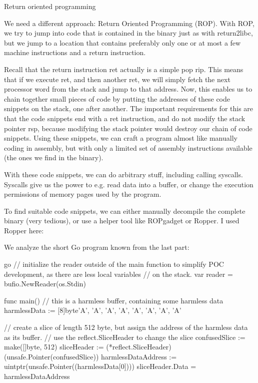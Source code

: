         Return oriented programming

        We need a different approach: Return Oriented Programming (ROP). With ROP, we try to jump into code that is contained
        in the binary just as with return2libc, but we jump to a location that contains preferably only one or at most a few
        machine instructions and a return instruction.

        Recall that the return instruction ret actually is a simple pop rip. This means that if we execute ret, and then
        another ret, we will simply fetch the next processor word from the stack and jump to that address. Now, this enables
        us to chain together small pieces of code by putting the addresses of these code snippets on the stack, one after
        another. The important requirements for this are that the code snippets end with a ret instruction, and do not modify
        the stack pointer rsp, because modifying the stack pointer would destroy our chain of code snippets. Using these
        snippets, we can craft a program almost like manually coding in assembly, but with only a limited set of assembly
        instructions available (the ones we find in the binary).

        With these code snippets, we can do arbitrary stuff, including calling syscalls. Syscalls give us the power to e.g.
        read data into a buffer, or change the execution permissions of memory pages used by the program.

        To find suitable code snippets, we can either manually decompile the complete binary (very tedious), or use a helper
        tool like ROPgadget or Ropper. I used Ropper here:


        We analyze the short Go program known from the last part:

        go
        // initialize the reader outside of the main function to simplify POC development, as there are less local variables
        // on the stack.
        var reader = bufio.NewReader(os.Stdin)

        func main()
        // this is a harmless buffer, containing some harmless data
        harmlessData := [8]byte'A', 'A', 'A', 'A', 'A', 'A', 'A', 'A'

        // create a slice of length 512 byte, but assign the address of the harmless data as its buffer.
        // use the reflect.SliceHeader to change the slice
        confusedSlice := make([]byte, 512)
        sliceHeader := (*reflect.SliceHeader)(unsafe.Pointer(confusedSlice))
        harmlessDataAddress := uintptr(unsafe.Pointer((harmlessData[0])))
        sliceHeader.Data = harmlessDataAddress

